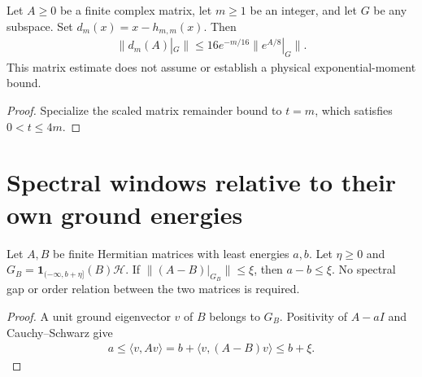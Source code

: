 \begin{lemma}
    \label{thm:soft_truncation_exponential_remainder_restriction}
    \leanok
    Let $A\ge0$ be a finite complex matrix, let $m\ge1$ be an integer,
    and let $G$ be any subspace. Set $d_m(x)=x-h_{m,m}(x)$. Then
    \begin{align*}
        \|d_m(A)|_G\|
        \le16e^{-m/16}\|e^{A/8}|_G\|.
    \end{align*}
    This matrix estimate does not assume or establish a physical
    exponential-moment bound.
\end{lemma}
\begin{proof}\leanok
    Specialize the scaled matrix remainder bound to $t=m$, which satisfies
    $0<t\le4m$.
\end{proof}

\section{Spectral windows relative to their own ground energies}

\begin{lemma}
    \label{thm:spectral_residual_ground_energy}
    \leanok
    Let $A,B$ be finite Hermitian matrices with least energies $a,b$.
    Let $\eta\ge0$ and $G_B=\mathbf1_{(-\infty,b+\eta]}(B)\mathcal H$.
    If $\|(A-B)|_{G_B}\|\le\xi$, then $a-b\le\xi$.
    No spectral gap or order relation between the two matrices is required.
\end{lemma}
\begin{proof}\leanok
    A unit ground eigenvector $v$ of $B$ belongs to $G_B$. Positivity of
    $A-aI$ and Cauchy--Schwarz give
    \begin{align*}
        a\le\langle v,Av\rangle
        =b+\langle v,(A-B)v\rangle\le b+\xi.
    \end{align*}
\end{proof}

